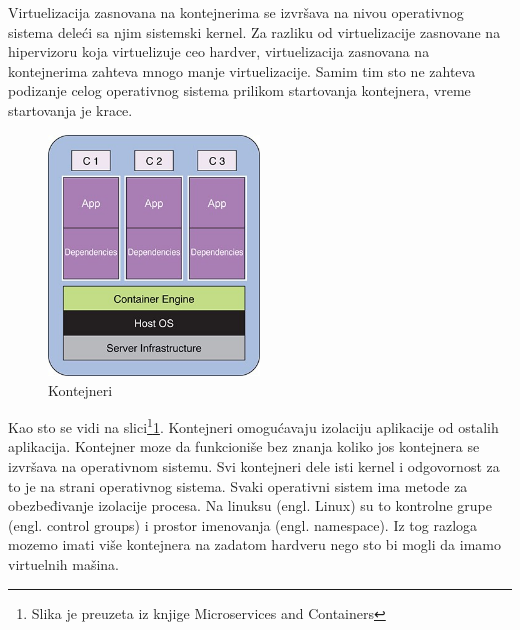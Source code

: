 \documentclass[12pt,oneside]{memoir}
\begin{document}
Virtuelizacija zasnovana na kontejnerima se izvršava na nivou operativnog sistema deleći sa njim sistemski kernel. Za razliku od virtuelizacije zasnovane na hipervizoru koja virtuelizuje ceo hardver, virtuelizacija zasnovana na kontejnerima zahteva mnogo manje virtuelizacije. Samim tim sto ne zahteva podizanje celog operativnog sistema prilikom startovanja kontejnera, vreme startovanja je krace\cite{gswc}. 
 
\begin{figure}[!ht]
  \centering
  \includegraphics[width=0.5\textwidth]{Slika 4.jpg}
  \caption{Kontejneri}
  \label{fig:kontejneri}
\end{figure}
 
Kao sto se vidi na slici\footnote{Slika je preuzeta iz knjige Microservices and Containers}\ref{fig:kontejneri}. Kontejneri omogućavaju izolaciju aplikacije od ostalih aplikacija. Kontejner moze da funkcioniše bez znanja koliko jos kontejnera se izvršava na operativnom sistemu. Svi kontejneri dele isti kernel i odgovornost za to je na strani operativnog sistema. Svaki operativni sistem ima metode za obezbeđivanje izolacije procesa. Na linuksu (engl. Linux) su to kontrolne grupe (engl. control groups) i prostor imenovanja (engl. namespace). Iz tog razloga mozemo imati više kontejnera na zadatom hardveru nego sto bi mogli da imamo virtuelnih mašina\cite{mac}. 
\end{document}
